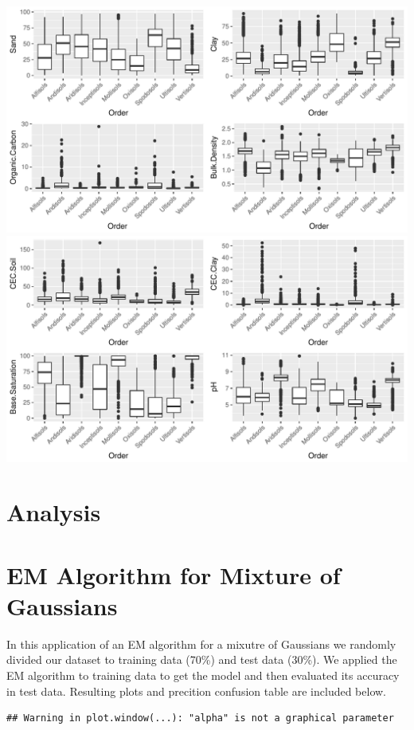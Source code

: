 \documentclass[]{article}
\begin{document}
\includegraphics{Project4_files/figure-latex/EDA - Mer-1.pdf}
\includegraphics{Project4_files/figure-latex/EDA - Mer-2.pdf}

\section{Analysis}\label{analysis}

\section{EM Algorithm for Mixture of
Gaussians}\label{em-algorithm-for-mixture-of-gaussians}

In this application of an EM algorithm for a mixutre of Gaussians we
randomly divided our dataset to training data (70\%) and test data
(30\%). We applied the EM algorithm to training data to get the model
and then evaluated its accuracy in test data. Resulting plots and
precition confusion table are included below.

\begin{verbatim}
## Warning in plot.window(...): "alpha" is not a graphical parameter
\end{verbatim}
\end{document}
